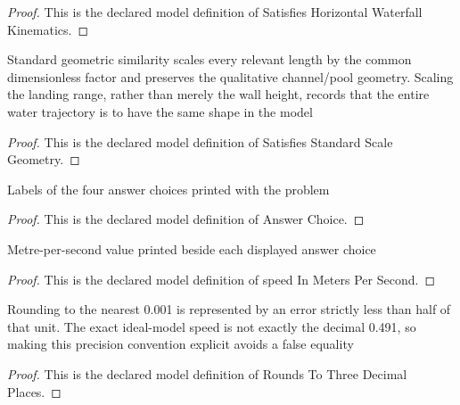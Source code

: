 \begin{proof}
  This is the declared model definition of Satisfies Horizontal Waterfall Kinematics.
\end{proof}
\begin{definition}
  \label{def:physics:phyx-mini-0684:phyxminiproblems-problemphyxmini0684-satisfiesstandardscalegeometry}
  Standard geometric similarity scales every relevant length by the common dimensionless factor and preserves the qualitative channel/pool geometry. Scaling the landing range, rather than merely the wall height, records that the entire water trajectory is to have the same shape in the model
\end{definition}
\begin{proof}
  This is the declared model definition of Satisfies Standard Scale Geometry.
\end{proof}
\begin{definition}
  \label{def:physics:phyx-mini-0684:phyxminiproblems-problemphyxmini0684-answerchoice}
  Labels of the four answer choices printed with the problem
\end{definition}
\begin{proof}
  This is the declared model definition of Answer Choice.
\end{proof}
\begin{definition}
  \label{def:physics:phyx-mini-0684:phyxminiproblems-problemphyxmini0684-answerchoice-speedinmeterspersecond}
  Metre-per-second value printed beside each displayed answer choice
\end{definition}
\begin{proof}
  This is the declared model definition of speed In Meters Per Second.
\end{proof}
\begin{definition}
  \label{def:physics:phyx-mini-0684:phyxminiproblems-problemphyxmini0684-roundstothreedecimalplaces}
  Rounding to the nearest 0.001 is represented by an error strictly less than half of that unit. The exact ideal-model speed is not exactly the decimal 0.491, so making this precision convention explicit avoids a false equality
\end{definition}
\begin{proof}
  This is the declared model definition of Rounds To Three Decimal Places.
\end{proof}
